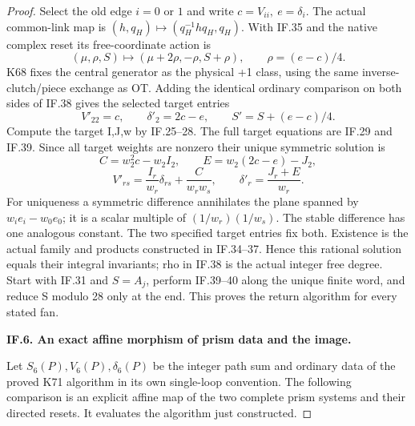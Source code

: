 \begin{proof}
Select the old edge \(i=0\) or \(1\) and write \(c=V_{ii},\ e=\delta_i\).  The actual
common-link map is
\((h,q_H)\mapsto(q_H^{-1}h q_H,q_H)\).  With IF.35 and the
native complex reset its free-coordinate action is
\[
 (\mu,\rho,S)\longmapsto(\mu+2\rho,-\rho,S+\rho),\qquad
                         \rho=(e-c)/4.
 \tag{IF.38}
\]
K68 fixes the central generator as the physical +1 class, using the
same inverse-clutch/piece exchange as OT.  Adding the identical
ordinary comparison on both sides of IF.38 gives the selected target
entries
\[
                V'_{22}=c,\qquad\delta'_2=2c-e,\qquad
                S'=S+(e-c)/4.
 \tag{IF.39}
\]
Compute the target I,J,w by IF.25--28.  The full target equations are
IF.29 and IF.39.  Since all target weights are nonzero their unique
symmetric solution is
\[
 C=w_2^2c-w_2I_2,\qquad E=w_2(2c-e)-J_2,
\]
\[
 V'_{rs}=\frac{I_r}{w_r}\delta_{rs}+\frac{C}{w_rw_s},\qquad
 \delta'_r=\frac{J_r+E}{w_r}.
 \tag{IF.40}
\]
For uniqueness a symmetric difference annihilates the plane spanned
by \(w_i e_i-w_0e_0\); it is a scalar multiple of
\((1/w_r)(1/w_s)\).  The stable difference has one analogous
constant.  The two specified target entries fix both.  Existence is
the actual family and products constructed in IF.34--37.  Hence this
rational solution equals their integral invariants; rho in IF.38 is
the actual integer free degree.  Start with IF.31 and \(S=A_j\), perform
IF.39--40 along the unique finite word, and reduce S modulo 28 only
at the end.  This proves the return algorithm for every stated fan.

\par\medskip\noindent\textbf{IF.6. An exact affine morphism of prism data and the image.}\par\nopagebreak[4]

Let \(S_6(P),V_6(P),\delta_6(P)\) be the integer path sum and ordinary data
of the proved K71 algorithm in its own single-loop convention.  The
following comparison is an explicit affine map of the two complete
prism systems and their directed resets.  It evaluates the algorithm
just constructed.


\end{proof}
